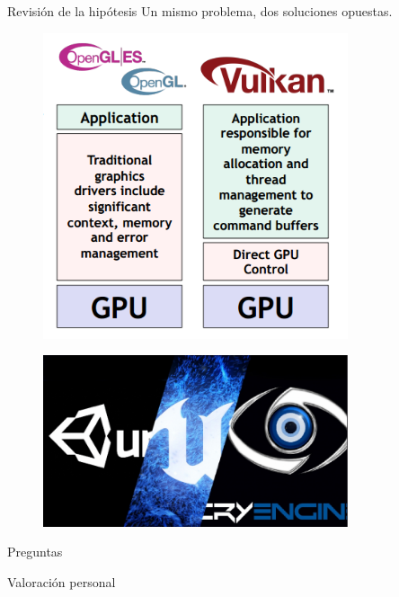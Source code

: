 \documentclass{beamer}
\begin{document}
\begin{frame}{Revisión de la hipótesis}
  Un mismo problema, dos soluciones opuestas.
  \vfill
  \begin{minipage}{0.45\textwidth}
    \centering
    \begin{figure}[h]
      \includegraphics[width=0.8\textwidth]{img/vulkan_info}
    \end{figure}
  \end{minipage}
  \begin{minipage}{0.45\textwidth}
    \centering
    \begin{figure}[h]
      \includegraphics[width=0.8\textwidth]{img/engines}
    \end{figure}
    \end{minipage}
\end{frame}
\begin{frame}{Preguntas}
\end{frame}
\begin{frame}{Valoración personal}
\end{frame}
\end{document}

